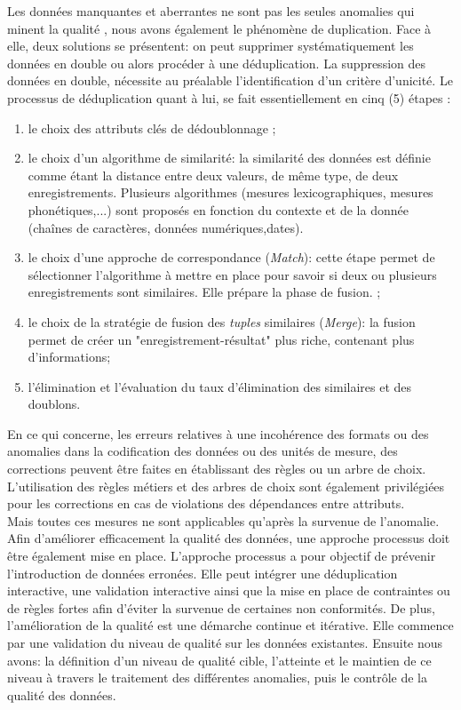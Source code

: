 Les donn\'ees manquantes et aberrantes ne sont pas les seules anomalies qui minent la qualit\'e , nous avons \'egalement le ph\'enom\`ene de duplication. Face \`a elle, deux solutions se pr\'esentent: on peut supprimer syst\'ematiquement les donn\'ees en double ou alors proc\'eder \`a une d\'eduplication. La suppression des donn\'ees en double, n\'ecessite au préalable l'identification d'un crit\`ere d'unicit\'e. Le processus de d\'eduplication quant \`a lui, se fait essentiellement en cinq (5) \'etapes  \cite{bensalem}: 

\begin{enumerate}[parsep=0cm,itemsep=0cm]
\item le choix des attributs cl\'es de dédoublonnage ;
\item le choix d’un algorithme de similarité: la similarité des données est définie comme étant la distance entre deux valeurs, de même type, de deux enregistrements. Plusieurs algorithmes (mesures lexicographiques, mesures phonétiques,...) sont propos\'es en fonction du contexte et de la donn\'ee (chaînes de caractères, données numériques,dates). 
\item le choix d'une approche de correspondance (\textit{Match}): cette \'etape permet de sélectionner l'algorithme \`a mettre en place pour savoir si deux ou plusieurs enregistrements sont similaires. Elle pr\'epare la phase de fusion. ;

\item le choix de la strat\'egie de fusion des \textit{tuples} similaires (\textit{Merge}): la fusion permet de créer un "enregistrement-résultat" plus riche, contenant plus d'informations;

\item l'\'elimination et l'\'evaluation du taux d'\'elimination des similaires et des doublons.

\end{enumerate}

En ce qui concerne, les erreurs relatives \`a une incohérence des formats ou des anomalies dans la codification des données ou des unités de mesure, des corrections peuvent \^etre faites en \'etablissant des r\`egles ou un arbre de choix. L'utilisation des r\`egles m\'etiers et des arbres de choix sont \'egalement privil\'egi\'ees pour les corrections en cas de violations des d\'ependances entre attributs.
\\

Mais toutes ces mesures ne sont applicables qu'apr\`es la survenue de l'anomalie. Afin d'am\'eliorer efficacement la qualit\'e des donn\'ees, une approche processus doit \^etre \'egalement mise en place. L’approche processus a pour objectif de prévenir l’introduction de données erronées. Elle peut int\'egrer une d\'eduplication interactive, une validation interactive ainsi que la mise en place de contraintes ou de r\`egles fortes afin d'éviter la survenue de certaines non conformités. De plus, l'am\'elioration de la qualit\'e est une d\'emarche continue et it\'erative. Elle commence par une validation du niveau de qualit\'e sur les donn\'ees existantes. Ensuite nous avons: la d\'efinition d'un niveau de qualit\'e cible, l'atteinte et le maintien de ce niveau \`a travers le traitement des diff\'erentes anomalies, puis le contr\^ole de la qualit\'e des donn\'ees.